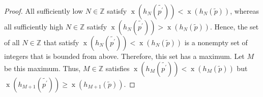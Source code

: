 \documentclass[reqno]{amsart}
\newcommand{\0}{\phantom{c}}
\newenvironment{verlong}{}{}
\theoremstyle{plain}
\theoremstyle{definition}
\numberwithin{equation}{section}
\begin{document}
\begin{verlong}
\begin{proof}
All sufficiently low $N\in\mathbb{Z}$ satisfy $\operatorname*{x}\left(
h_{N}\left(  \widetilde{p^{\prime}}\right)  \right)  <\operatorname*{x}\left(
h_{N}\left(  \widetilde{p}\right)  \right)  $, whereas all sufficiently high
$N\in\mathbb{Z}$ satisfy $\operatorname*{x}\left(  h_{N}\left(
\widetilde{p^{\prime}}\right)  \right)  >\operatorname*{x}\left(  h_{N}\left(
\widetilde{p}\right)  \right)  $. Hence, the set of all $N\in\mathbb{Z}$ that
satisfy $\operatorname*{x}\left(  h_{N}\left(  \widetilde{p^{\prime}}\right)
\right)  <\operatorname*{x}\left(  h_{N}\left(  \widetilde{p}\right)  \right)
$ is a nonempty set of integers that is bounded from above. Therefore, this
set has a maximum. Let $M$ be this maximum. Thus, $M\in\mathbb{Z}$ satisfies
$\operatorname*{x}\left(  h_{M}\left(  \widetilde{p^{\prime}}\right)  \right)
<\operatorname*{x}\left(  h_{M}\left(  \widetilde{p}\right)  \right)  $ but
$\operatorname*{x}\left(  h_{M+1}\left(  \widetilde{p^{\prime}}\right)
\right)  \geq\operatorname*{x}\left(  h_{M+1}\left(  \widetilde{p}\right)
\right)  $.


\end{proof}
\end{verlong}
\end{document}
